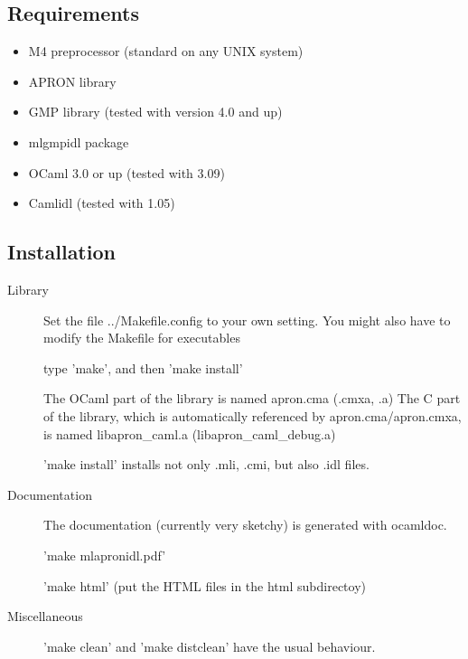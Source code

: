 \documentclass[twoside,10pt,a4paper]{report}
\begin{document}
\subsection*{Requirements}

\begin{itemize}
\item M4 preprocessor (standard on any UNIX system)
\item APRON library
\item GMP library (tested with version 4.0 and up)
\item mlgmpidl package
\item OCaml 3.0 or up (tested with 3.09)
\item Camlidl (tested with 1.05)
\end{itemize}

\subsection*{Installation}

\begin{description}
\item[Library]
Set the file ../Makefile.config to your own setting.
You might also have to modify the Makefile for executables

type 'make', and then 'make install'

The OCaml part of the library is named apron.cma (.cmxa, .a) The C
part of the library, which is automatically referenced by
apron.cma/apron.cmxa, is named libapron\_caml.a
(libapron\_caml\_debug.a)

'make install' installs not only .mli, .cmi, but also .idl files.
\item[Documentation]
The documentation (currently very sketchy) is generated with ocamldoc.

'make mlapronidl.pdf'

'make html' (put the HTML files in the html subdirectoy)

\item[Miscellaneous]
'make clean' and 'make distclean' have the usual behaviour.
\end{description}

\end{document}
